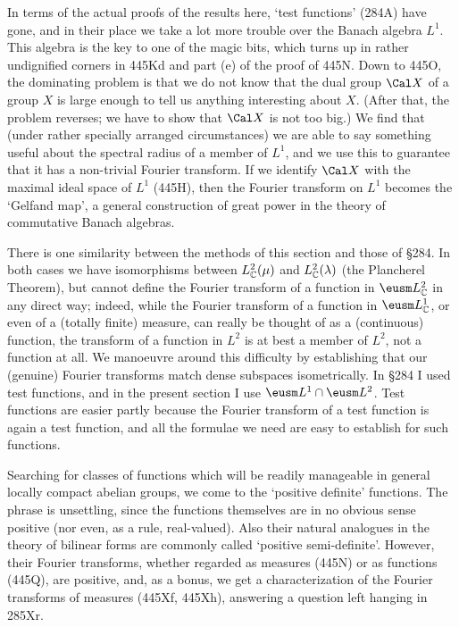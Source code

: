 {In terms of the actual proofs of the results here, `test functions'
(284A) have gone, and in their place we take a lot more trouble over the
Banach algebra $L^1$.   This algebra is the key to one of the magic
bits, which turns up in rather undignified corners in 445Kd and part (e)
of the proof of 445N.   Down to 445O, the dominating problem is that we
do not know that the dual group $\Cal X$ of a group $X$ is large enough
to tell us anything interesting about $X$.   (After that, the problem
reverses;  we have to show that $\Cal X$ is not too big.)   We find that
(under rather specially arranged circumstances) we are able to say
something useful about the spectral radius of a member of $L^1$, and we
use this to guarantee that it has a non-trivial Fourier transform.   If
we identify $\Cal X$ with the maximal ideal space of $L^1$ (445H), then
the Fourier transform on $L^1$ becomes the `Gelfand map', a general
construction of great power in the theory of commutative Banach
algebras.

There is one similarity between the methods of this section and those of
\S284.   In both cases we have isomorphisms between $L_{\Bbb C}^2(\mu)$
and $L_{\Bbb C}^2(\lambda)$ (the Plancherel Theorem), but cannot define
the Fourier
transform of a function in $\eusm L_{\Bbb C}^2$ in any direct way;
indeed, while
the Fourier transform of a function in $\eusm L_{\Bbb C}^1$, or even of
a (totally finite) measure, can really be thought of as a (continuous)
function, the transform of a function in $L^2$ is at best a member of
$L^2$, not a function at all.   We manoeuvre around this difficulty by
establishing that our (genuine) Fourier transforms match dense subspaces
isometrically.   In \S284 I used test functions, and in the present
section I use $\eusm L^1\cap\eusm L^2$.   Test functions are easier
partly because the Fourier transform of a test function is again a test
function, and all the formulae we need are easy to establish for such
functions.

Searching for classes of functions which will be readily manageable in
general locally compact abelian groups, we come to the `positive
definite' functions.   The phrase is unsettling, since the functions
themselves are in no obvious sense positive (nor even, as a rule,
real-valued).   Also their natural analogues in the theory of bilinear
forms are commonly called `positive semi-definite'.   However, their
Fourier transforms, whether regarded as
measures (445N) or as functions (445Q), are positive, and, as a bonus,
we get a characterization of the Fourier transforms of measures (445Xf,
445Xh), answering a question left hanging in 285Xr.
}%

\discrpage

